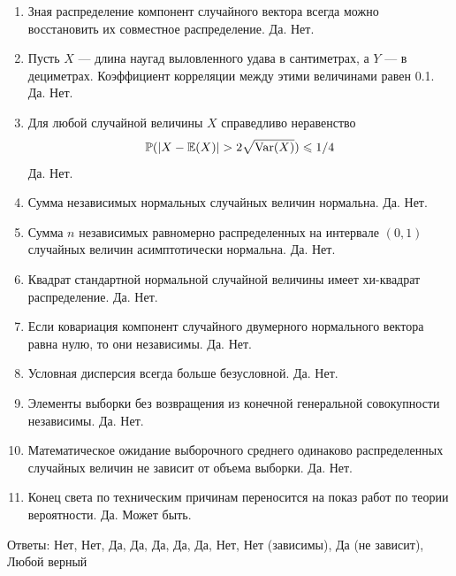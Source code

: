 \documentclass[12pt, a4paper]{article}\usepackage[]{graphicx}\usepackage[]{color}
\begin{document}
				\begin{enumerate}
					\item Зная распределение компонент случайного вектора всегда можно восстановить их совместное распределение. Да. Нет.
					\item Пусть $X$ — длина наугад выловленного удава в сантиметрах, а $Y$ — в дециметрах. Коэффициент корреляции между этими величинами равен 0.1. Да. Нет.
					\item Для любой случайной величины $X$ справедливо неравенство
					\[ \P(|X-\E(X)|>2\sqrt{\Var(X)})\leq 1/4 \]
					Да. Нет.
					\item Сумма независимых нормальных случайных величин нормальна. Да. Нет.
					\item  Сумма $n$ независимых равномерно распределенных на интервале $(0,1)$ случайных величин асимптотически нормальна. Да. Нет.
					\item Квадрат стандартной нормальной случайной величины имеет хи-квадрат распределение. Да. Нет.
					\item Если ковариация компонент случайного двумерного нормального вектора равна нулю, то они независимы. Да. Нет.
					\item Условная дисперсия всегда больше безусловной. Да. Нет.
					\item Элементы выборки без возвращения из конечной генеральной совокупности независимы. Да. Нет.
					\item Математическое ожидание выборочного среднего одинаково распределенных случайных величин не зависит от объема выборки. Да. Нет.
					\item Конец света по техническим причинам переносится на показ работ по теории вероятности. Да. Может быть.
				\end{enumerate}

				Ответы: Нет, Нет, Да, Да, Да, Да, Да, Нет, Нет (зависимы), Да (не зависит), Любой верный
\end{document}
